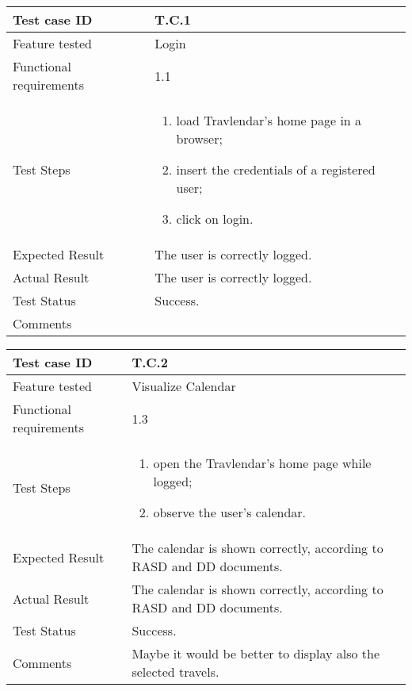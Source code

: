 \begin{table}[H]
	\begin{center}
		\begin{tabular}{ | p{} | p{} | }
		\hline
		Test case ID & T.C.1\\
		\hline
		Feature tested & Login  \\
		\hline
		Functional requirements & 1.1  \\
		\hline
		Test Steps & 
			\begin{enumerate}
				\item load Travlendar's home page in a browser;
				\item insert the credentials of a registered user;
				\item click on login.
			\end{enumerate} \\
		\hline
		Expected Result & The user is correctly logged.\\
		\hline
		Actual Result & The user is correctly logged.\\ 
		\hline
		Test Status & \color{ForestGreen}Success.\\ 
		\hline
		Comments & \\ 
		\hline
		\end{tabular}
	\end{center}
\end{table}

\begin{table}[H]
	\begin{center}
		\begin{tabular}{ | p{} | p{} | }
		\hline
		Test case ID & T.C.2\\
		\hline
		Feature tested & Visualize Calendar  \\
		\hline
		Functional requirements & 1.3  \\
		\hline
		Test Steps & 
			\begin{enumerate}
				\item open the Travlendar's home page while logged;
				\item observe the user's calendar.
			\end{enumerate} \\
		\hline
		Expected Result & The calendar is shown correctly, according to RASD and DD documents.\\
		\hline
		Actual Result & The calendar is shown correctly, according to RASD and DD documents.\\ 
		\hline
		Test Status & \color{ForestGreen}Success.\\ 
		\hline
		Comments & Maybe it would be better to display also the selected travels.  \\ 
		\hline
		\end{tabular}
	\end{center}
\end{table}

